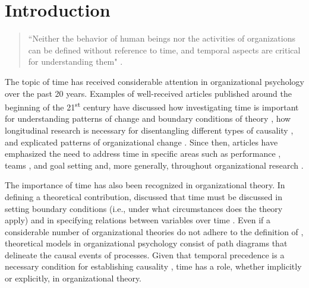 \documentclass[
12pt, %
twoside,
english]{guelphthesis}
\begin{document}
\hypertarget{introduction}{%
\chapter{Introduction}\label{introduction}}
\begin{quote}
    ``Neither the behavior of human beings nor the activities of organizations can be defined without reference to time, and temporal aspects are critical for understanding them" \parencite[][p. 136]{navarro2015}.
\end{quote}
The topic of time has received considerable attention in organizational psychology over the past 20 years. Examples of well-received articles published around the beginning of the 21\textsuperscript{st} century have discussed how investigating time is important for
understanding patterns of change and boundary conditions of theory
\autocite{zaheer1999}, how longitudinal research is necessary for disentangling
different types of causality \autocite{mitchell2001}, and explicated patterns
of organizational change \autocite[or institutionalization;][]{lawrence2001}.
Since then, articles have emphasized the need to address time in
specific areas such as performance \autocite{fisher2008,dalal2014}, teams \autocite{roe2012}, and goal setting \autocite{fried2004} and, more generally, throughout organizational research \autocite{george2000,roe2008,ployhart2010,sonnentag2012,navarro2015,shipp2015,kunisch2017,vantilborgh2018,aguinis2021}.

The importance of time has also been recognized in organizational theory. In defining a theoretical contribution, \textcite{whetten1989} discussed that time must be discussed in setting boundary conditions (i.e., under what circumstances does the theory apply) and in specifying relations between variables over time \autocite{mitchell2001,george2000}. Even if a considerable number of organizational theories do not adhere to the definition of \textcite{whetten1989}, theoretical models in organizational psychology consist of path diagrams that delineate the causal events of processes. Given that temporal precedence is a necessary condition for establishing causality \autocite{mill2011}, time has a role, whether implicitly or explicitly, in organizational theory.
\end{document}
